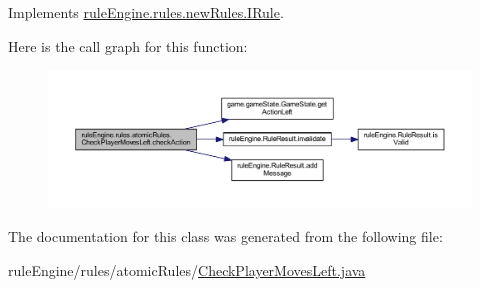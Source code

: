 Implements \mbox{\hyperlink{interfacerule_engine_1_1rules_1_1new_rules_1_1_i_rule_a72ce29a47d7a5fba75a09444a50a481e}{rule\+Engine.\+rules.\+new\+Rules.\+I\+Rule}}.

Here is the call graph for this function\+:
\nopagebreak
\begin{figure}[H]
\begin{center}
\leavevmode
\includegraphics[width=350pt]{classrule_engine_1_1rules_1_1atomic_rules_1_1_check_player_moves_left_a3a8f57bf10ee10f87444523e98dda4d0_cgraph}
\end{center}
\end{figure}


The documentation for this class was generated from the following file\+:\begin{DoxyCompactItemize}
\item 
rule\+Engine/rules/atomic\+Rules/\mbox{\hyperlink{_check_player_moves_left_8java}{Check\+Player\+Moves\+Left.\+java}}\end{DoxyCompactItemize}
